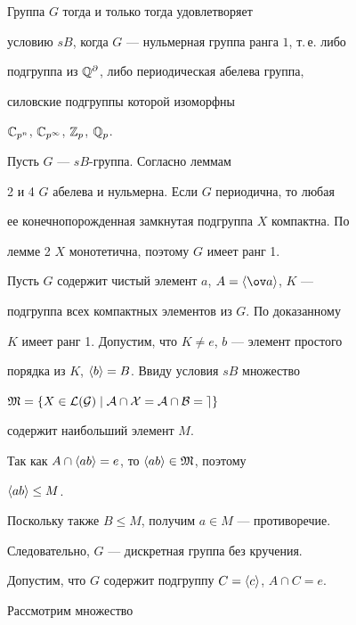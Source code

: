  


\begin{thmnonum} 


Группа $G$ тогда и только тогда удовлетворяет  


условию $sB$, когда $G$ --- нульмерная группа ранга $1$, т.\,е. либо 


подгруппа из $\Bbb Q^\partial$, либо периодическая абелева группа, 


силовские подгруппы которой изоморфны 


$\Bbb C_{p^n}$, $\Bbb C_{p^\infty}$, $\Bbb Z_p$, $\Bbb Q_p$. 


\end{thmnonum} 


 


\begin{pf} 


Пусть $G$ --- $sB$-группа. Согласно леммам  


2 и 4\; $G$ абелева и нульмерна. Если $G$ периодична, то любая  


ее конечнопорожденная замкнутая подгруппа $X$ компактна. По  


лемме 2\; $X$ монотетична, поэтому $G$ имеет ранг 1. 


 


Пусть $G$ содержит чистый элемент $a$, $A=\la\ov a\ra$, $K$ --- 


подгруппа всех компактных элементов из $G$. По доказанному  


$K$ имеет ранг 1. Допустим, что $K\ne e$, $b$ --- элемент простого 


порядка из $K$, $\langle b\rangle=B$. Ввиду условия $sB$ множество 


$\frak M=\{X\in\cal L(G)\mid A\cap X=A\cap B=e\}$ 


содержит наибольший элемент $M$.  


Так как $A\cap\langle ab\rangle=e$, то $\langle ab\rangle\in\frak M$, поэтому 


$\langle ab\rangle\le M$. 


Поскольку также $B\le M$, получим $a\in M$ --- противоречие. 


Следовательно, $G$ --- дискретная группа без кручения. 


 


Допустим, что $G$ содержит подгруппу $C=\langle c\rangle$, $A\cap C=e$. 


Рассмотрим множество 



\end{pf}
